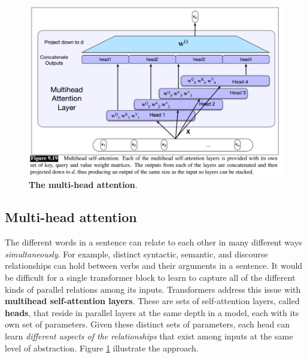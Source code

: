 \documentclass[11pt]{article}
\begin{document}
\begin{figure}
\begin{minipage}[t]{1\linewidth}
  \centering
  \centerline{\includegraphics[scale = 0.4]{multi-head-attn.png}}
\end{minipage}
\caption{\footnotesize{\textbf{The multi-head attention}.}}
\label{fig: multi-head-attn}
\end{figure}

\subsection{Multi-head attention}
The different words in a sentence can relate to each other in many different ways \emph{simultaneously}. For example, distinct syntactic, semantic, and discourse relationships
can hold between verbs and their arguments in a sentence. It would be difficult for a single transformer block to learn to capture all of the different kinds of parallel
relations among its inputs. Transformers address this issue with \textbf{multihead self-attention layers}. These are sets of self-attention layers, called \textbf{heads}, that reside in parallel layers at the same depth in a model, each with its own set of parameters. Given these distinct sets of parameters, each head can learn \emph{different aspects of the relationships} that exist among inputs at the same level of abstraction.  Figure \ref{fig: multi-head-attn} illustrate the approach. 
\end{document}
